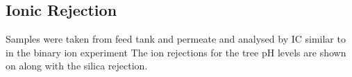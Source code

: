 






\subsection{Ionic Rejection}
Samples were taken from feed tank and permeate and analysed by IC similar to in the binary ion experiment 
The ion rejections for the tree pH levels are shown on  along with the silica rejection.

